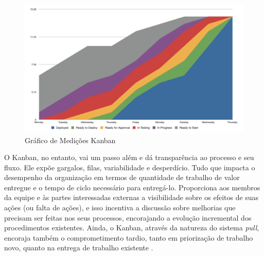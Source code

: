 \begin{figure}[H]
		\centering
		\label{fig05}
			\includegraphics[scale=0.4]{figuras/metricasKanban.png}
		\caption{Gráfico de Medições Kanban  \cite{klipp}}
\end{figure}

O Kanban, no entanto, vai um passo além e dá transparência ao processo e seu fluxo. Ele expõe gargalos, filas, variabilidade e desperdício. Tudo que impacta o desempenho da organização em termos de quantidade de trabalho de valor entregue e o tempo de ciclo necessário para entregá-lo. Proporciona aos membros da equipe e às partes interessadas externas a visibilidade sobre os efeitos de suas ações (ou falta de ações), e isso incentiva a discussão sobre melhorias que precisam ser feitas nos seus processos, encorajando a evolução incremental dos procedimentos existentes. Ainda, o Kanban, através da natureza do sistema \textit{pull}, encoraja também o comprometimento tardio, tanto em priorização de trabalho novo, quanto na entrega de trabalho existente \cite{kniberg2009}. 
